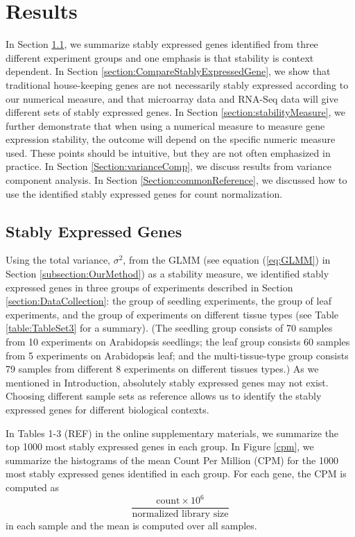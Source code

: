 \documentclass[11pt, a4paper]{article}
\begin{document}
\section{Results} \label{section:Results}
In Section \ref{section:stablyExpressedGene}, we summarize stably expressed genes identified from three
different experiment groups and one emphasis is that stability is
context dependent. In Section \ref{section:CompareStablyExpressedGene}, we show that traditional house-keeping
genes are not necessarily stably expressed according to our numerical measure, 
and that microarray data and RNA-Seq data will give different sets of stably
expressed genes.  In Section \ref{section:stabilityMeasure}, we further demonstrate that when using a
numerical measure to measure gene expression stability, the outcome will
depend on the specific numeric measure used.  These points should be
intuitive, but they are not often emphasized in practice.  In Section
\ref{Section:varianceComp}, we discuss results from variance component analysis. In Section
\ref{Section:commonReference}, we discussed how to use the identified stably
expressed genes for count normalization.

\subsection{Stably Expressed Genes}\label{section:stablyExpressedGene}
Using the total variance, $\sigma^2$, from the GLMM (see
equation (\ref{eq:GLMM}) in Section \ref{subsection:OurMethod}) as a
stability measure, we identified stably expressed genes in three groups of
experiments described in Section \ref{section:DataCollection}: the group of seedling
experiments, the group of leaf experiments, and the group of experiments on
different tissue types (see Table \ref{table:TableSet3} for a summary).  (The
seedling group consists of 70 samples from 10 experiments on Arabidopsis
seedlings; the leaf group consists 60 samples from 5 experiments on
Arabidopsis leaf; and the multi-tissue-type group consists 79 samples from
different 8 experiments on different tissues types.) As we mentioned in
Introduction, absolutely stably expressed genes may not exist.  Choosing
different sample sets as reference allows us to identify the stably expressed
genes for different biological contexts.

In Tables 1-3 (REF) in the online supplementary materials, we summarize the
top 1000 most stably expressed genes in each group.  In Figure \ref{cpm}, we
summarize the histograms of the mean Count Per Million (CPM) for the 1000
most stably expressed genes identified in each group. For each gene, the CPM
is computed as \[ \dfrac{ \text{count} \times 10^6 }{ \text{normalized library
size}} \] in each sample and the mean is computed over all samples.
 
\end{document}
